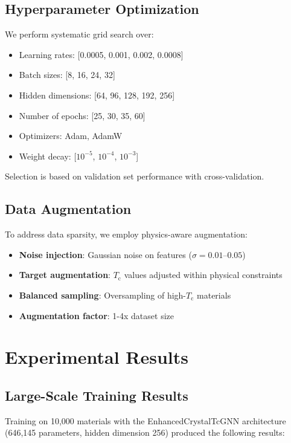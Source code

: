 \documentclass[11pt,a4paper]{article}
\begin{document}
\subsection{Hyperparameter Optimization}

We perform systematic grid search over:

\begin{itemize}
    \item Learning rates: [0.0005, 0.001, 0.002, 0.0008]
    \item Batch sizes: [8, 16, 24, 32]
    \item Hidden dimensions: [64, 96, 128, 192, 256]
    \item Number of epochs: [25, 30, 35, 60]
    \item Optimizers: Adam, AdamW
    \item Weight decay: [$10^{-5}$, $10^{-4}$, $10^{-3}$]
\end{itemize}

Selection is based on validation set performance with cross-validation.

\subsection{Data Augmentation}

To address data sparsity, we employ physics-aware augmentation:

\begin{itemize}
    \item \textbf{Noise injection}: Gaussian noise on features ($\sigma = 0.01$--$0.05$)
    \item \textbf{Target augmentation}: $T_{\text{c}}$ values adjusted within physical constraints
    \item \textbf{Balanced sampling}: Oversampling of high-$T_{\text{c}}$ materials
    \item \textbf{Augmentation factor}: 1-4x dataset size
\end{itemize}

\section{Experimental Results}

\subsection{Large-Scale Training Results}

Training on 10,000 materials with the EnhancedCrystalTcGNN architecture (646,145 parameters, hidden dimension 256) produced the following results:
\end{document}
